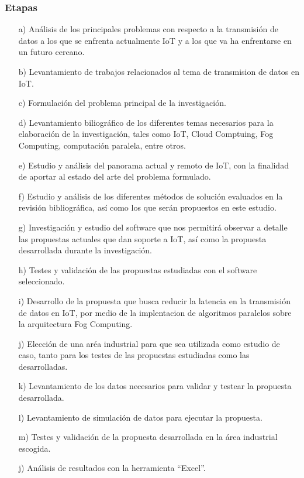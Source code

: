             \subsubsection{Etapas}
                \begin{enumerate}
                    \item[a)] Análisis de los principales problemas con respecto a la transmisión de datos a los que se enfrenta actualmente IoT y a los que va ha enfrentarse en un futuro cercano.
                    \item[b)] Levantamiento de trabajos relacionados al tema de transmision de datos en IoT.
                    \item[c)] Formulación del problema principal de la investigación.
                    \item[d)] Levantamiento biliográfico de los diferentes temas necesarios para la elaboración de la investigación, tales como IoT, Cloud Comptuing, Fog Computing, computación paralela, entre otros.
                    \item[e)] Estudio y análisis del panorama actual y remoto de IoT, con la finalidad de aportar al estado del arte del problema formulado.
                    \item[f)] Estudio y análisis de los diferentes métodos de solución evaluados en la revisión bibliográfica, así como los que serán propuestos en este estudio.
                    \item[g)] Investigación y estudio del software que nos permitirá observar a detalle las propuestas actuales que dan soporte a IoT, así como la propuesta desarrollada durante la investigación.
                    \item[h)] Testes y validación de las propuestas estudiadas con el software seleccionado. 
                    \item[i)] Desarrollo de la propuesta que busca reducir la latencia en la transmisión de datos en IoT, por medio de la implentacion de algoritmos paralelos sobre la arquitectura Fog Computing.
                    \item[j)] Elección de una aréa industrial para que sea utilizada como estudio de caso, tanto para los testes de las propuestas estudiadas como las desarrolladas.
                    \item[k)] Levantamiento de los datos necesarios para validar y testear la propuesta desarrollada.
                    \item[l)] Levantamiento de simulación de datos para ejecutar la propuesta.
                    \item[m)] Testes y validación de la propuesta desarrollada en la área industrial escogida.
                    \item[j)] Análisis de resultados con la herramienta ``Excel''. 
                \end{enumerate}                
